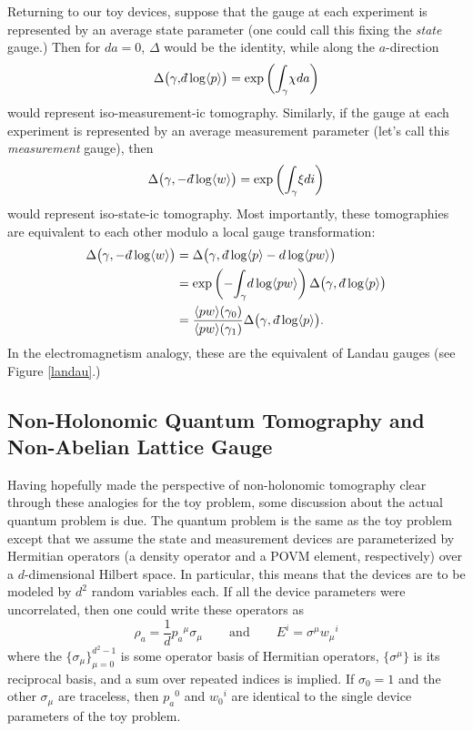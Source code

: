 \documentclass[pra, 10pt, notitlepage, twocolumn]{revtex4-1}
\def\dbar{{\mathchar'26\mkern-12mu d}}
\begin{document}
Returning to our toy devices, suppose that the gauge at each experiment is represented by an average state parameter (one could call this fixing the \emph{state} gauge.)
Then for $da=0$, $\Delta$ would be the identity, while along the $a$-direction
\begin{equation}\label{sgauge}
\Delta\big(\gamma,\dbar \log\langle p \rangle\big) = \exp\left(\int_\gamma\!\chi da\right)
\end{equation}
would represent iso-measurement-ic tomography.
Similarly, if the gauge at each experiment is represented by an average measurement parameter (let's call this \emph{measurement} gauge), then
\begin{equation}\label{mgauge}
\Delta\big(\gamma,-\,\dbar \log\langle w \rangle\big) = \exp\left(\int_\gamma\! \xi di\right)
\end{equation}
would represent iso-state-ic tomography.
Most importantly, these tomographies are equivalent to each other modulo a local gauge transformation:
\begin{align}
\Delta\big(\gamma,-\,\dbar \log\langle w \rangle\big) & = \Delta\big(\gamma,\,\dbar \log\langle p \rangle - d\log\langle pw\rangle\big)\\
& = \exp\left(-\!\int_\gamma\!d \log\langle pw \rangle\right)\Delta\big(\gamma,\,\dbar \log\langle p \rangle\big)\\
& = \frac{\langle pw \rangle(\gamma_0)}{\langle pw \rangle(\gamma_1)}\Delta\big(\gamma,\,\dbar \log\langle p \rangle\big).
\end{align}
In the electromagnetism analogy, these are the equivalent of Landau gauges (see Figure \ref{landau}.)




\subsection{Non-Holonomic Quantum Tomography and Non-Abelian Lattice Gauge}\label{lattice}

Having hopefully made the perspective of non-holonomic tomography clear through these analogies for the toy problem,
some discussion about the actual quantum problem is due.\cite{jackson2015detecting}
The quantum problem is the same as the toy problem
except that we assume the state and measurement devices are parameterized by Hermitian operators (a density operator and a POVM element, respectively) over a $d$-dimensional Hilbert space.
In particular, this means that the devices are to be modeled by $d^2$ random variables each.
If all the device parameters were uncorrelated, then one could write these operators as
\begin{equation}
\rho_a = \frac{1}{d}{p_a}^\mu\sigma_\mu
\hspace{25pt}\text{and}\hspace{25pt}
E^i = \sigma^\mu{w_\mu}^i
\end{equation}
where the $\{\sigma_\mu\}_{\mu=0}^{d^2-1}$ is some operator basis of Hermitian operators, $\{\sigma^\mu\}$ is its reciprocal basis, and a sum over repeated indices is implied.
If $\sigma_0=1$ and the other $\sigma_\mu$ are traceless, then ${p_a}^0$ and ${w_0}^i$ are identical to the single device parameters of the toy problem.
\end{document}
